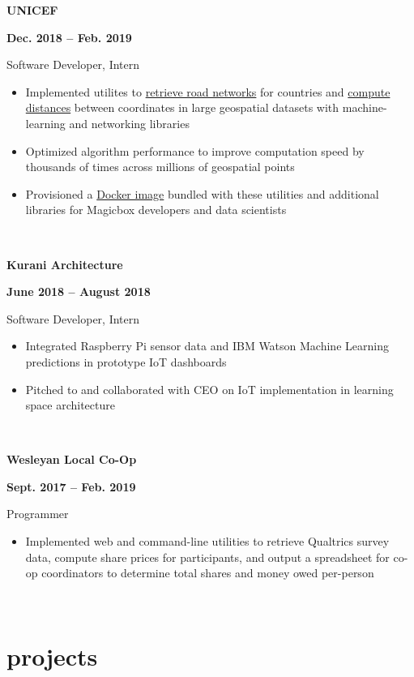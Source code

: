 \documentclass[letterpaper, 10.5pt]{article}
\newcommand{\expentry}[5]{

    \begin{minipage}[b]{0.5\textwidth}
        \raggedright
        \bf\large #3
        \end{minipage}%
        \begin{minipage}[b]{0.5\textwidth}
        \raggedleft
        \bf {#1} -- {#2}
        \end{minipage}

    \begin{minipage}[t]{\linewidth}
    \vspace{-3mm}
    #4
    \vspace{-1.75mm}
    \small{#5}
    \end{minipage}\\
    \vspace{1mm}
    }
\begin{document}
    \expentry{Dec. 2018}
    {Feb. 2019}
    {UNICEF}
    {Software Developer, Intern}
    {

        \begin{itemize}{\leftmargin=0.5em \itemindent=0em}
          \setlength\itemsep{-0.5mm}
          \item Implemented utilites to \href{https://github.com/unicef/magicbox-download-roads}{retrieve road networks} for countries and \href{https://github.com/msradam/magicbox-site-routing}{compute distances} between coordinates in large geospatial datasets with machine-learning and networking libraries
          \item Optimized algorithm performance to improve computation speed by thousands of times across millions of geospatial points
          \item Provisioned a \href{https://hub.docker.com/r/msradam/magicbox-tools}{Docker image} bundled with these utilities and additional libraries for Magicbox developers and data scientists
        \end{itemize}
        
    }

    \expentry{June 2018}
    {August 2018}
    {Kurani Architecture}
    {Software Developer, Intern}
    {\begin{itemize}
          \setlength\itemsep{-0.5mm}
          \item Integrated Raspberry Pi sensor data and IBM Watson Machine Learning predictions in prototype IoT dashboards
          \item Pitched to and collaborated with CEO on IoT implementation in learning space architecture 
        \end{itemize}
    }

    \expentry{Sept. 2017}
    {Feb. 2019}
    {Wesleyan Local Co-Op}
    {Programmer}
    {\begin{itemize}
          \setlength\itemsep{-0.5mm}
          \item Implemented web and command-line utilities to retrieve Qualtrics survey data, compute share prices for participants, and output a spreadsheet for co-op coordinators to determine total shares and money owed per-person
        \end{itemize}
    }

    \section{projects}
\end{document}
